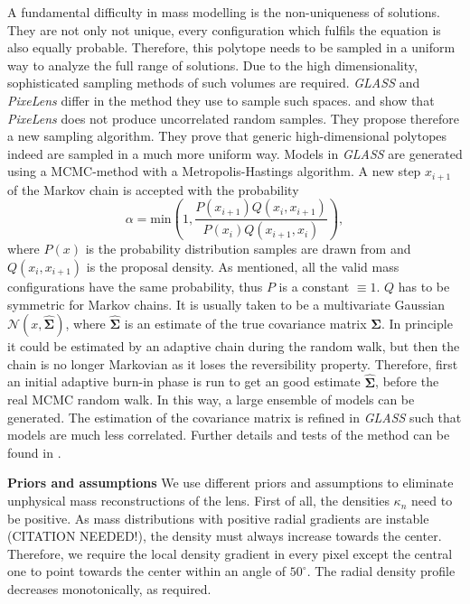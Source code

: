 \documentclass[useAMS,usenatbib]{mn2e}
\begin{document}
A fundamental difficulty in mass modelling is the non-uniqueness of solutions. They are not only not unique, every configuration which fulfils the equation is also equally probable. Therefore, this polytope needs to be sampled in a uniform way to analyze the full range of solutions. Due to the high dimensionality, sophisticated sampling methods of such volumes are required. \textit{GLASS} and \textit{PixeLens} differ in the method they use to sample such spaces. \cite{2008ApJ...679...17C} and \cite{2012MNRAS.425.3077L} show that \textit{PixeLens} does not produce uncorrelated random samples. They propose therefore a new sampling algorithm. They prove that generic high-dimensional polytopes indeed are sampled in a much more uniform way. Models in \textit{GLASS} are generated using a MCMC-method with a Metropolis-Hastings algorithm. A new step $x_{i+1}$ of the Markov chain is accepted with the probability
\begin{equation}
 \alpha = \mathrm{min}\left(1,\frac{P(x_{i+1})Q(x_{i},x_{i+1})}{P(x_{i})Q(x_{i+1},x_{i})}\right),
\end{equation}
where $P(x)$ is the probability distribution samples are drawn from and $Q(x_{i},x_{i+1})$ is the proposal density. As mentioned, all the valid mass configurations have the same probability, thus $P$ is a constant $\equiv1$. $Q$ has to be symmetric for Markov chains. It is usually taken to be a multivariate Gaussian $\mathcal{N}(x,\hat{\boldsymbol\Sigma})$, where $\hat{\boldsymbol\Sigma}$ is an estimate of the true covariance matrix $\boldsymbol\Sigma$. In principle it could be estimated by an adaptive chain during the random walk, but then the chain is no longer Markovian as it loses the reversibility property. Therefore, first an initial adaptive burn-in phase is run to get an good estimate $\hat{\boldsymbol\Sigma}$, before the real MCMC random walk. In this way, a large ensemble of models can be generated. The estimation of the covariance matrix is refined in \textit{GLASS} such that models are much less correlated. Further details and tests of the method can be found in \cite{2012MNRAS.425.3077L}.

\textbf{Priors and assumptions}
We use different priors and assumptions to eliminate unphysical mass reconstructions of the lens. First of all, the densities $\kappa_{n}$ need to be positive. As mass distributions with positive radial gradients are instable (CITATION NEEDED!), the density must always increase towards the center. Therefore, we require the local density gradient in every pixel except the central one to point towards the center within an angle of $50^{\circ}$. The radial density profile decreases monotonically, as required.
\end{document}
